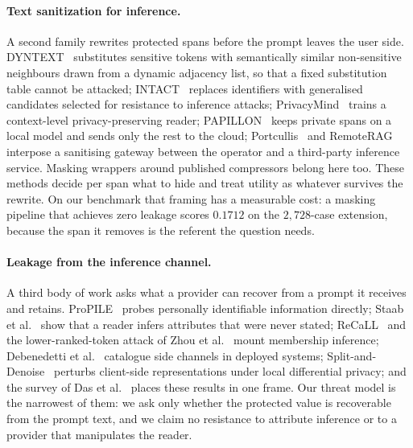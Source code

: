 \paragraph{Text sanitization for inference.}
A second family rewrites protected spans before the prompt leaves the user side.
DYNTEXT~\cite{dyntext} substitutes sensitive tokens with semantically similar non-sensitive
neighbours drawn from a dynamic adjacency list, so that a fixed substitution table cannot be
attacked; INTACT~\cite{intact} replaces identifiers with generalised candidates selected for
resistance to inference attacks; PrivacyMind~\cite{xiao-privacymind-2024} trains a
context-level privacy-preserving reader; PAPILLON~\cite{siyan-papillon-2025} keeps private
spans on a local model and sends only the rest to the cloud; Portcullis~\cite{zhan-portcullis-2025}
and RemoteRAG~\cite{cheng-remoterag-2025} interpose a sanitising gateway between the operator
and a third-party inference service. Masking wrappers around published compressors belong
here too. These methods decide per span what to hide and treat utility as whatever survives
the rewrite. On our benchmark that framing has a measurable cost: a masking pipeline that
achieves zero leakage scores $0.1712$ on the $2{,}728$-case extension, because the span it
removes is the referent the question needs.

\paragraph{Leakage from the inference channel.}
A third body of work asks what a provider can recover from a prompt it receives and retains.
ProPILE~\cite{kim-propile-2023} probes personally identifiable information directly; Staab et
al.~\cite{staab-beyond-2024} show that a reader infers attributes that were never stated;
ReCaLL~\cite{xie-recall-2024} and the lower-ranked-token attack of Zhou et
al.~\cite{zhou-shadows-2025} mount membership inference; Debenedetti et
al.~\cite{debenedetti-sidechannel-2024} catalogue side channels in deployed systems;
Split-and-Denoise~\cite{mai-splitdenoise-2024} perturbs client-side representations under
local differential privacy; and the survey of Das et al.~\cite{das-survey-2025} places these
results in one frame. Our threat model is the narrowest of them: we ask only whether the
protected value is recoverable from the prompt text, and we claim no resistance to attribute
inference or to a provider that manipulates the reader.

